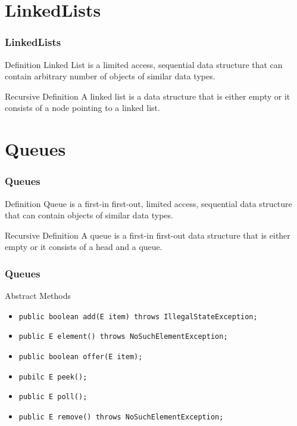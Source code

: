 \documentclass[10pt, compress]{beamer}
\begin{document}
\section{LinkedLists}

\begin{frame}[fragile]
	\frametitle{LinkedLists}
	\begin{block}{Definition}
		Linked List is a limited access, sequential data structure that can contain arbitrary number of objects of similar data types.
	\end{block}
	\begin{block}{Recursive Definition}
		A linked list is a data structure that is either empty or it consists of a node pointing to a linked list.
	\end{block}
\end{frame}

\section{Queues}

\begin{frame}[fragile]
	\frametitle{Queues}
	\begin{block}{Definition}
		Queue is a \alert{first-in first-out}, limited access, sequential data structure that can contain objects of similar data types.
	\end{block}
	\begin{block}{Recursive Definition}
		A queue is a first-in first-out data structure that is either empty or it consists of a head and a queue.
	\end{block}
\end{frame}

\begin{frame}[fragile]
	\frametitle{Queues}
	\begin{block}{Abstract Methods}
		\begin{itemize}
			\item[] \texttt{public boolean add(E item) throws IllegalStateException;}
			\item[] \texttt{public E element() throws NoSuchElementException;}
			\item[] \texttt{public boolean offer(E item);}
			\item[] \texttt{pubilc E peek();}
			\item[] \texttt{public E poll();}
			\item[] \texttt{public E remove() throws NoSuchElementException;}
		\end{itemize}
	\end{block}
\end{frame}
\end{document}
